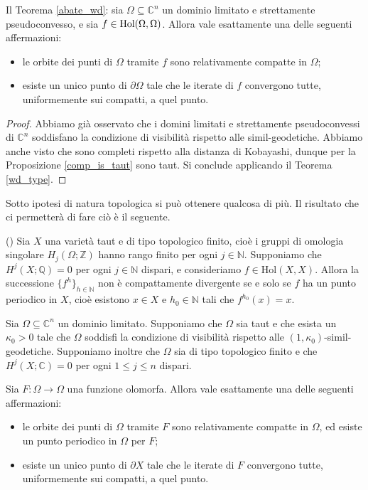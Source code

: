 \begin{cor}
    Il Teorema \ref{abate_wd}: sia $\Omega \subseteq \mathbb{C}^n$ un dominio limitato e strettamente pseudoconvesso, e sia $f \in \textnormal{Hol}(\Omega,\Omega)$. Allora vale esattamente una delle seguenti affermazioni:
    \begin{itemize}
        \item le orbite dei punti di $\Omega$ tramite $f$ sono relativamente compatte in $\Omega$;
        \item esiste un unico punto di $\partial\Omega$ tale che le iterate di $f$ convergono tutte, uniformemente sui compatti, a quel punto.
    \end{itemize}
\end{cor}

\begin{proof}
    Abbiamo già osservato che i domini limitati e strettamente pseudoconvessi di $\mathbb{C}^n$ soddisfano la condizione di visibilità rispetto alle simil-geodetiche. Abbiamo anche visto che sono completi rispetto alla distanza di Kobayashi, dunque per la Proposizione \ref{comp_is_taut} sono taut. Si conclude applicando il Teorema \ref{wd_type}.
\end{proof}

Sotto ipotesi di natura topologica si può ottenere qualcosa di più. Il risultato che ci permetterà di fare ciò è il seguente.

\begin{thm} \label{periodico}
    (\cite[Theorem 0.4]{A2}) Sia $X$ una varietà taut e di tipo topologico finito, cioè i gruppi di omologia singolare $H_j(\Omega;\mathbb{Z})$ hanno rango finito per ogni $j\in\mathbb{N}$. Supponiamo che $H^j(X;\mathbb{Q})=0$ per ogni $j\in\mathbb{N}$ dispari, e consideriamo $f\in\text{Hol}(X,X)$. Allora la successione $\{f^h\}_{h\in\mathbb{N}}$ non è compattamente divergente se e solo se $f$ ha un punto periodico in $X$, cioè esistono $x\in X$ e $h_0\in\mathbb{N}$ tali che $f^{h_0}(x)=x$.
\end{thm}

\begin{cor}
    Sia $\Omega\subseteq\mathbb{C}^n$ un dominio limitato. Supponiamo che $\Omega$ sia taut e che esista un $\kappa_0>0$ tale che $\Omega$ soddisfi la condizione di visibilità rispetto alle $(1,\kappa_0)$-simil-geodetiche. Supponiamo inoltre che $\Omega$ sia di tipo topologico finito e che $H^j(X;\mathbb{C})=0$ per ogni $1\le j\le n$ dispari.

    Sia $F:\Omega\longrightarrow\Omega$ una funzione olomorfa. Allora vale esattamente una delle seguenti affermazioni:
    \begin{itemize}
        \item le orbite dei punti di $\Omega$ tramite $F$ sono relativamente compatte in $\Omega$, ed esiste un punto periodico in $\Omega$ per $F$;
        \item esiste un unico punto di $\partial X$ tale che le iterate di $F$ convergono tutte, uniformemente sui compatti, a quel punto.
    \end{itemize}
\end{cor}

